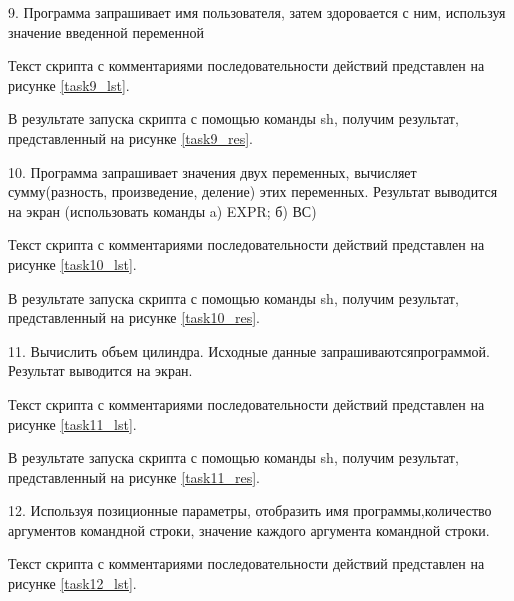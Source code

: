 
9. Программа  запрашивает  имя  пользователя,  затем  здоровается  с  ним, используя значение введенной переменной

Текст скрипта с комментариями последовательности действий представлен на рисунке \ref{task9_lst}.


В результате запуска скрипта с помощью команды sh, получим результат, представленный на рисунке \ref{task9_res}.


10. Программа запрашивает значения двух переменных, вычисляет сумму(разность,  произведение,  деление)  этих  переменных.  Результат  выводится  на экран (использовать команды a) EXPR; б) ВС)

Текст скрипта с комментариями последовательности действий представлен на рисунке \ref{task10_lst}.


В результате запуска скрипта с помощью команды sh, получим результат, представленный на рисунке \ref{task10_res}.


11. Вычислить  объем  цилиндра.  Исходные  данные  запрашиваютсяпрограммой. Результат выводится на экран.

Текст скрипта с комментариями последовательности действий представлен на рисунке \ref{task11_lst}.


В результате запуска скрипта с помощью команды sh, получим результат, представленный на рисунке \ref{task11_res}.


12. Используя  позиционные  параметры,  отобразить  имя  программы,количество  аргументов  командной  строки,  значение  каждого  аргумента командной строки.

Текст скрипта с комментариями последовательности действий представлен на рисунке \ref{task12_lst}.


